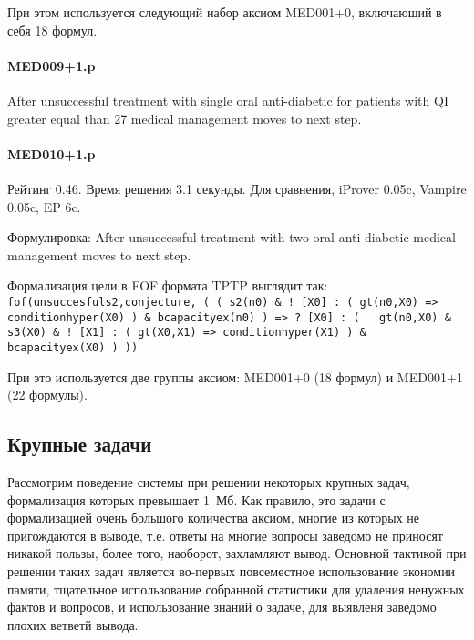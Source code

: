 При этом используется следующий набор аксиом MED001+0, включающий в себя 18 формул.

\paragraph{MED009+1.p}
After unsuccessful treatment with single oral anti-diabetic for patients with QI greater equal than 27 medical management moves to next step.

\paragraph{MED010+1.p}
Рейтинг 0.46. Время решения 3.1 секунды. Для сравнения, iProver 0.05c, Vampire 0.05c, EP 6c.

Формулировка: After unsuccessful treatment with two oral anti-diabetic medical management moves to next step.

Формализация цели в FOF формата TPTP выглядит так:
\texttt{fof(unsuccesfuls2,conjecture,
    ( ( s2(n0)
      \& ! [X0] :
          ( gt(n0,X0)
         => conditionhyper(X0) )
      \& bcapacityex(n0) )
   => ? [X0] :
        ( ~ gt(n0,X0)
        \& s3(X0)
        \& ! [X1] :
            ( gt(X0,X1)
           => conditionhyper(X1) )
        \& bcapacityex(X0) ) ))}

При это используется две группы аксиом: MED001+0 (18 формул) и MED001+1 (22 формулы).







\subsection{Крупные задачи}
Рассмотрим поведение системы при решении некоторых крупных задач, формализация которых превышает 1~Мб. Как правило, это задачи с формализацией очень большого количества аксиом, многие из которых не пригождаются в выводе, т.е. ответы на многие вопросы заведомо не приносят никакой пользы, более того, наоборот, захламляют вывод. Основной тактикой при решении таких задач является во-первых повсеместное использование экономии памяти, тщательное использование собранной статистики для удаления ненужных фактов и вопросов, и использование знаний о задаче, для выявленя заведомо плохих ветветй вывода.

